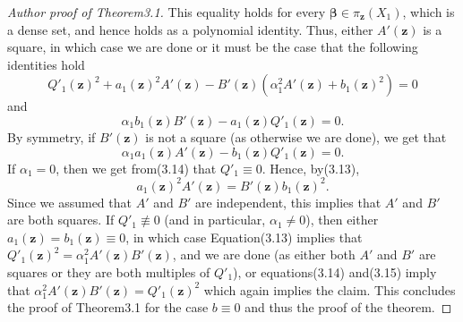 \documentclass[10pt,a4paper]{article}
\begin{document}
\begin{proof}[Author proof of Theorem3.1]
This equality holds for every $\boldsymbol\beta\in\pi_{\mathbf z}(X_1)$, which is a dense set, and hence holds as a polynomial identity. Thus, either $A'(\mathbf z)$ is a square, in which case we are done or it must be the case that the following identities hold
\begin{equation}Q'_1(\mathbf z)^2+a_1(\mathbf z)^2A'(\mathbf z)-B'(\mathbf z)\left(\alpha_1^2A'(\mathbf z)+b_1(\mathbf z)^2\right)=0\tag{3.13}\end{equation}
and
\begin{equation}\alpha_1b_1(\mathbf z)B'(\mathbf z)-a_1(\mathbf z)Q'_1(\mathbf z)=0.\tag{3.14}\end{equation}
By symmetry, if $B'(\mathbf z)$ is not a square (as otherwise we are done), we get that
\begin{equation}\alpha_1a_1(\mathbf z)A'(\mathbf z)-b_1(\mathbf z)Q'_1(\mathbf z)=0.\tag{3.15}\end{equation}
If $\alpha_1=0$, then we get from(3.14) that $Q'_1\equiv0$. Hence, by(3.13),
\[a_1(\mathbf z)^2A'(\mathbf z)=B'(\mathbf z)b_1(\mathbf z)^2.\]
Since we assumed that $A'$ and $B'$ are independent, this implies that $A'$ and $B'$ are both squares. If $Q'_1\not\equiv0$ (and in particular, $\alpha_1\ne0$), then either $a_1(\mathbf z)=b_1(\mathbf z)\equiv0$, in which case Equation(3.13) implies that $Q'_1(\mathbf z)^2=\alpha_1^2A'(\mathbf z)B'(\mathbf z)$, and we are done (as either both $A'$ and $B'$ are squares or they are both multiples of $Q'_1$), or equations(3.14) and(3.15) imply that $\alpha_1^2A'(\mathbf z)B'(\mathbf z)=Q'_1(\mathbf z)^2$ which again implies the claim.
This concludes the proof of Theorem3.1 for the case $b\equiv0$ and thus the proof of the theorem.
\end{proof}
\end{document}
